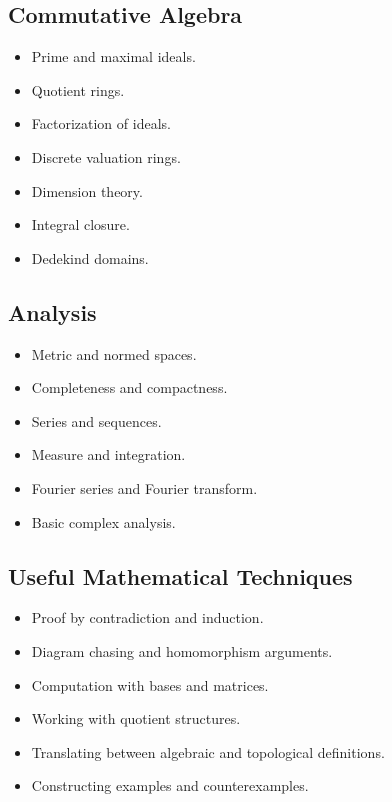 \documentclass[11pt]{article}
\begin{document}
\subsection{Commutative Algebra}

\begin{itemize}
    \item Prime and maximal ideals.
    \item Quotient rings.
    \item Factorization of ideals.
    \item Discrete valuation rings.
    \item Dimension theory.
    \item Integral closure.
    \item Dedekind domains.
\end{itemize}

\subsection{Analysis}

\begin{itemize}
    \item Metric and normed spaces.
    \item Completeness and compactness.
    \item Series and sequences.
    \item Measure and integration.
    \item Fourier series and Fourier transform.
    \item Basic complex analysis.
\end{itemize}

\subsection{Useful Mathematical Techniques}

\begin{itemize}
    \item Proof by contradiction and induction.
    \item Diagram chasing and homomorphism arguments.
    \item Computation with bases and matrices.
    \item Working with quotient structures.
    \item Translating between algebraic and topological definitions.
    \item Constructing examples and counterexamples.
\end{itemize}
\end{document}
